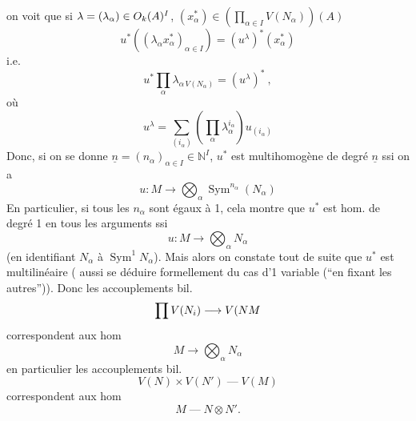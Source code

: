 on voit que si $\lambda=(\lambda_\alpha)\in{O_k}(A)^I$, $(x_\alpha^*)\in\left(\prod_{\alpha\in I}V(N_\alpha)\right)(A)$
\[
u^*((\lambda_\alpha x_\alpha^*)_{\alpha\in I})=(u^\lambda)^*(x_\alpha^*)
\]
i.e.
\[
u^*\prod_\alpha\lambda_{\alpha\,V(N_\alpha)}=(u^\lambda)^*\ ,
\]
où 
\[
u^\lambda=\sum_{(i_\alpha)}\left(\prod_\alpha\lambda_\alpha^{i_\alpha}\right)u_{(i_\alpha)}
\]
Donc, si on se donne $\underline n=(n_\alpha)_{\alpha\in I}\in\mathbb{N}^I$, $u^*$ est multihomogène de degré $\underline n$ ssi on a
\[
u:M\longrightarrow\bigotimes_\alpha\operatorname{Sym}^{n_\alpha}(N_\alpha)
\]
En particulier, si tous les $n_\alpha$ sont égaux à 1, cela montre que $u^*$ est hom. de degré 1 en tous les arguments ssi
\[
u:M\longrightarrow\bigotimes_\alpha N_\alpha
\]
(en identifiant $N_\alpha$ à $\operatorname{Sym}^1N_\alpha$). Mais alors on constate tout de suite que $u^*$ est \inserted{$=$} multilinéaire ( aussi se déduire formellement du cas d'1 variable (``en fixant les autres'')). Donc les accouplements bil.
\[
\prod V(N_i)\longrightarrow{{V(N}}M
\]
correspondent aux hom
\[
M\longrightarrow\bigotimes_\alpha N_\alpha
\]
en particulier les accouplements bil.
\[
V(N)\times V(N')\mathbin{\text{---}}V(M)
\]
correspondent aux hom
\[
M\mathbin{\text{---}}N\otimes N'.
\]
